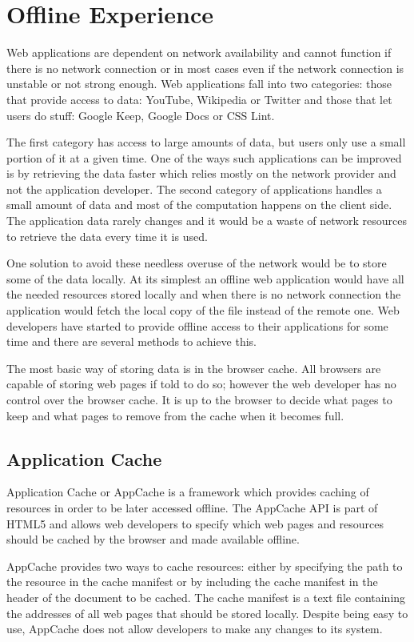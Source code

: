 \documentclass[10pt,a4paper,twoside]{book}
\begin{document}
\section{Offline Experience}
Web applications are dependent on network availability and cannot function if there is no network connection or in most cases even if the network connection is unstable or not strong enough. Web applications fall into two categories: those that provide access to data: YouTube, Wikipedia or Twitter and those that let users do stuff: Google Keep, Google Docs or CSS Lint.

The first category has access to large amounts of data, but users only use a small portion of it at a given time. One of the ways such applications can be improved is by retrieving the data faster which relies mostly on the network provider and not the application developer. The second category of applications handles a small amount of data and most of the computation happens on the client side. 	The application data rarely changes and it would be a waste of network resources to retrieve the data every time it is used. 

One solution to avoid these needless overuse of the network would be to store some of the data locally. At its simplest an offline web application would have all the needed resources stored locally and when there is no network connection the application would fetch the local copy of the file instead of the remote one.  Web developers have started to provide offline access to their applications for some time and there are several methods to achieve this.

The most basic way of storing data is in the browser cache. All browsers are capable of storing web pages if told to do so; however the web developer has no control over the browser cache. It is up to the browser to decide what pages to keep and what pages to remove from the cache when it becomes full. 

\subsection{Application Cache}
Application Cache or AppCache is a framework which provides caching of resources in order to be later accessed offline. The AppCache API is part of HTML5 and allows web developers to specify which web pages and resources should be cached by the browser and made available offline.

AppCache provides two ways to cache resources: either by specifying the path to the resource in the cache manifest or by including the cache manifest in the header of the document to be cached. The cache manifest is a text file containing the addresses of all web pages that should be stored locally. Despite being easy to use, AppCache does not allow developers to make any changes to its system. 
\end{document}
